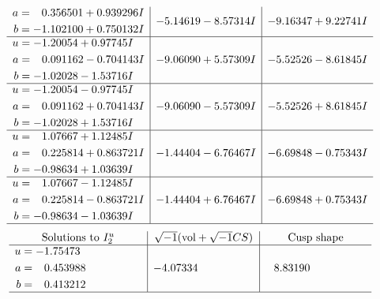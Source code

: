 \documentclass[1p]{elsarticle_modified}
\theoremstyle{definition}
\newcommand{\I}{\sqrt{-1}}
\begin{document}
$$\begin{array}{c|c|c}
\begin{aligned}
a &= \phantom{-}0.356501 + 0.939296 I \\
b &= -1.102100 + 0.750132 I\end{aligned}
 & -5.14619 - 8.57314 I & -9.16347 + 9.22741 I \\ \hline\begin{aligned}
u &= -1.20054 + 0.97745 I \\
a &= \phantom{-}0.091162 - 0.704143 I \\
b &= -1.02028 - 1.53716 I\end{aligned}
 & -9.06090 + 5.57309 I & -5.52526 - 8.61845 I \\ \hline\begin{aligned}
u &= -1.20054 - 0.97745 I \\
a &= \phantom{-}0.091162 + 0.704143 I \\
b &= -1.02028 + 1.53716 I\end{aligned}
 & -9.06090 - 5.57309 I & -5.52526 + 8.61845 I \\ \hline\begin{aligned}
u &= \phantom{-}1.07667 + 1.12485 I \\
a &= \phantom{-}0.225814 + 0.863721 I \\
b &= -0.98634 + 1.03639 I\end{aligned}
 & -1.44404 - 6.76467 I & -6.69848 - 0.75343 I \\ \hline\begin{aligned}
u &= \phantom{-}1.07667 - 1.12485 I \\
a &= \phantom{-}0.225814 - 0.863721 I \\
b &= -0.98634 - 1.03639 I\end{aligned}
 & -1.44404 + 6.76467 I & -6.69848 + 0.75343 I\\
 \hline 
 \end{array}$$\newpage$$\begin{array}{c|c|c}  
\text{Solutions to }I^u_{2}& \I (\text{vol} + \sqrt{-1}CS) & \text{Cusp shape}\\
 \hline 
\begin{aligned}
u &= -1.75473\phantom{ +0.000000I} \\
a &= \phantom{-}0.453988\phantom{ +0.000000I} \\
b &= \phantom{-}0.413212\phantom{ +0.000000I}\end{aligned}
 & -4.07334\phantom{ +0.000000I} & \phantom{-}8.83190\phantom{ +0.000000I}\\
 \hline 
 \end{array}$$\newpage\newpage\renewcommand{\arraystretch}{1}
\end{document}
